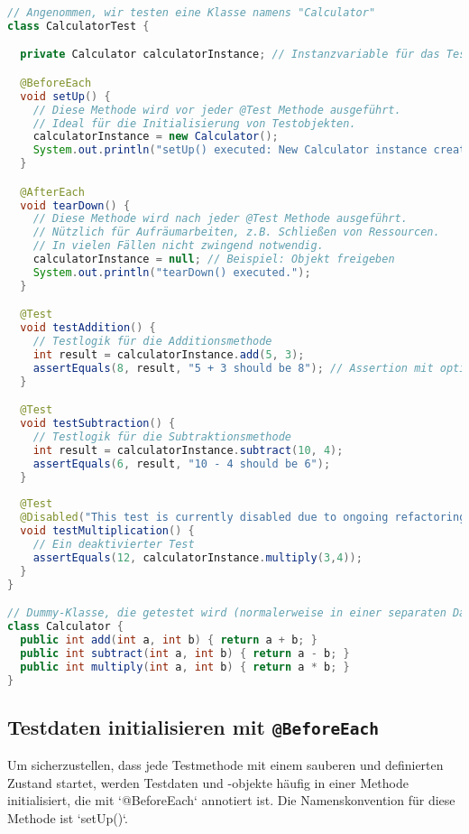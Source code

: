 \begin{lstlisting}[language=Java, caption={Grundgerüst einer JUnit Testklasse}]
// Angenommen, wir testen eine Klasse namens "Calculator"
class CalculatorTest {

  private Calculator calculatorInstance; // Instanzvariable für das Testobjekt

  @BeforeEach
  void setUp() {
    // Diese Methode wird vor jeder @Test Methode ausgeführt.
    // Ideal für die Initialisierung von Testobjekten.
    calculatorInstance = new Calculator();
    System.out.println("setUp() executed: New Calculator instance created.");
  }

  @AfterEach
  void tearDown() {
    // Diese Methode wird nach jeder @Test Methode ausgeführt.
    // Nützlich für Aufräumarbeiten, z.B. Schließen von Ressourcen.
    // In vielen Fällen nicht zwingend notwendig.
    calculatorInstance = null; // Beispiel: Objekt freigeben
    System.out.println("tearDown() executed.");
  }

  @Test
  void testAddition() {
    // Testlogik für die Additionsmethode
    int result = calculatorInstance.add(5, 3);
    assertEquals(8, result, "5 + 3 should be 8"); // Assertion mit optionaler Nachricht
  }

  @Test
  void testSubtraction() {
    // Testlogik für die Subtraktionsmethode
    int result = calculatorInstance.subtract(10, 4);
    assertEquals(6, result, "10 - 4 should be 6");
  }
    
  @Test
  @Disabled("This test is currently disabled due to ongoing refactoring.")
  void testMultiplication() {
    // Ein deaktivierter Test
    assertEquals(12, calculatorInstance.multiply(3,4));
  }
}

// Dummy-Klasse, die getestet wird (normalerweise in einer separaten Datei)
class Calculator {
  public int add(int a, int b) { return a + b; }
  public int subtract(int a, int b) { return a - b; }
  public int multiply(int a, int b) { return a * b; }
}
\end{lstlisting}

\subsection{Testdaten initialisieren mit \texttt{@BeforeEach}}
\label{ssec:junit_beforeeach}
Um sicherzustellen, dass jede Testmethode mit einem sauberen und definierten Zustand startet, werden Testdaten und -objekte häufig in einer Methode initialisiert, die mit `@BeforeEach` annotiert ist. Die Namenskonvention für diese Methode ist `setUp()`.

